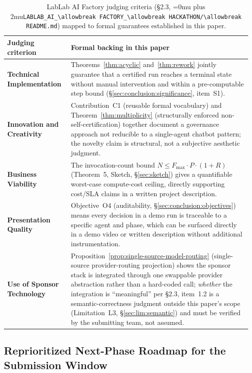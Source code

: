 \documentclass[12pt]{article}
\theoremstyle{definition}
\DeclareRobustCommand{\code}[1]{\begingroup\Urlmuskip=0mu plus 2mu\relax\nolinkurl{#1}\endgroup}
\newcommand{\LabLabFactoryReadme}{\code{LABLAB\_AI\_\allowbreak FACTORY\_\allowbreak HACKATHON/\allowbreak README.md}}
\begin{document}
\begin{table}[H]
\centering
\caption{LabLab AI Factory judging criteria (\S2.3, \LabLabFactoryReadme{})
         mapped to formal guarantees established in this paper.}
\label{tab:lablab-judging-mapping}
\begin{tabularx}{\linewidth}{@{}>{\bfseries\RaggedRight}p{3.0cm} >{\RaggedRight\arraybackslash}X@{}}
\toprule
\textbf{Judging criterion} & \textbf{Formal backing in this paper} \\
\midrule
Technical Implementation &
  Theorems~\ref{thm:acyclic} and~\ref{thm:rework} jointly guarantee
  that a certified run reaches a terminal state without manual
  intervention and within a pre-computable step bound
  (\S\ref{sec:conclusion:significance}, item~S1). \\[4pt]
Innovation and Creativity &
  Contribution~C1 (reusable formal vocabulary) and
  Theorem~\ref{thm:multiplicity} (structurally enforced
  non-self-certification) together document a governance approach not
  reducible to a single-agent chatbot pattern; the novelty claim is
  structural, not a subjective aesthetic judgment. \\[4pt]
Business Viability &
  The invocation-count bound $N \leq F_{\max}\cdot P\cdot(1+R)$
  (Theorem~5, Sketch, \S\ref{sec:sketch}) gives a quantifiable
  worst-case compute-cost ceiling, directly supporting cost/SLA
  claims in a written project description. \\[4pt]
Presentation Quality &
  Objective~O4 (auditability, \S\ref{sec:conclusion:objectives}) means
  every decision in a demo run is traceable to a specific agent and
  phase, which can be surfaced directly in a demo video or written
  description without additional instrumentation. \\[4pt]
Use of Sponsor Technology &
  Proposition~\ref{prop:single-source-model-routing} (single-source
  provider-routing projection) shows the sponsor stack is integrated
  through one swappable provider abstraction rather than a hard-coded
  call; \emph{whether} the integration is ``meaningful'' per \S2.3,
  item~1.2 is a semantic-correctness judgment outside this paper's
  scope (Limitation~L3, \S\ref{sec:lim:semantic}) and must be verified
  by the submitting team, not assumed. \\
\bottomrule
\end{tabularx}
\end{table}

\subsection{Reprioritized Next-Phase Roadmap for the Submission Window}
\label{app:lablab-factory-roadmap}
\end{document}
